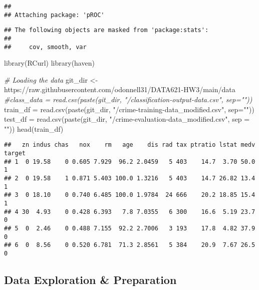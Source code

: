 \documentclass[
]{article}
\newenvironment{Shaded}{\begin{snugshade}}{\end{snugshade}}
\newcommand{\AttributeTok}[1]{\textcolor[rgb]{0.77,0.63,0.00}{#1}}
\newcommand{\CommentTok}[1]{\textcolor[rgb]{0.56,0.35,0.01}{\textit{#1}}}
\newcommand{\FunctionTok}[1]{\textcolor[rgb]{0.00,0.00,0.00}{#1}}
\newcommand{\NormalTok}[1]{#1}
\newcommand{\OtherTok}[1]{\textcolor[rgb]{0.56,0.35,0.01}{#1}}
\newcommand{\StringTok}[1]{\textcolor[rgb]{0.31,0.60,0.02}{#1}}
\begin{document}
\begin{verbatim}
## 
## Attaching package: 'pROC'
\end{verbatim}

\begin{verbatim}
## The following objects are masked from 'package:stats':
## 
##     cov, smooth, var
\end{verbatim}

\begin{Shaded}
\begin{Highlighting}[]
\FunctionTok{library}\NormalTok{(RCurl)}
\FunctionTok{library}\NormalTok{(haven)}
\end{Highlighting}
\end{Shaded}

\begin{Shaded}
\begin{Highlighting}[]
\CommentTok{\# Loading the data}
\NormalTok{git\_dir }\OtherTok{\textless{}{-}} \StringTok{\textquotesingle{}https://raw.githubusercontent.com/odonnell31/DATA621{-}HW3/main/data\textquotesingle{}}
\CommentTok{\#class\_data = read.csv(paste(git\_dir, "/classification{-}output{-}data.csv", sep=""))}
\NormalTok{train\_df }\OtherTok{=} \FunctionTok{read.csv}\NormalTok{(}\FunctionTok{paste}\NormalTok{(git\_dir, }\StringTok{"/crime{-}training{-}data\_modified.csv"}\NormalTok{, }\AttributeTok{sep=}\StringTok{""}\NormalTok{))}
\NormalTok{test\_df }\OtherTok{=} \FunctionTok{read.csv}\NormalTok{(}\FunctionTok{paste}\NormalTok{(git\_dir, }\StringTok{"/crime{-}evaluation{-}data\_modified.csv"}\NormalTok{, }\AttributeTok{sep =} \StringTok{""}\NormalTok{))}
\FunctionTok{head}\NormalTok{(train\_df)}
\end{Highlighting}
\end{Shaded}

\begin{verbatim}
##   zn indus chas   nox    rm   age    dis rad tax ptratio lstat medv target
## 1  0 19.58    0 0.605 7.929  96.2 2.0459   5 403    14.7  3.70 50.0      1
## 2  0 19.58    1 0.871 5.403 100.0 1.3216   5 403    14.7 26.82 13.4      1
## 3  0 18.10    0 0.740 6.485 100.0 1.9784  24 666    20.2 18.85 15.4      1
## 4 30  4.93    0 0.428 6.393   7.8 7.0355   6 300    16.6  5.19 23.7      0
## 5  0  2.46    0 0.488 7.155  92.2 2.7006   3 193    17.8  4.82 37.9      0
## 6  0  8.56    0 0.520 6.781  71.3 2.8561   5 384    20.9  7.67 26.5      0
\end{verbatim}

\hypertarget{data-exploration-preparation}{%
\subsection{Data Exploration \&
Preparation}\label{data-exploration-preparation}}
\end{document}
